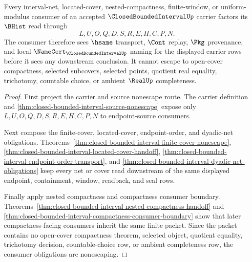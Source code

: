 \begin{theorem}
\label{thm:closed-bounded-interval-consumer-nonescape-obligations}
Every interval-net, located-cover, nested-compactness, finite-window, or uniform-modulus consumer of an accepted $\ClosedBoundedIntervalUp$ carrier factors its $\BHist$ read through
$$
L,U,O,Q,D,S,R,E,H,C,P,N .
$$
The consumer therefore sees $\hsame$ transport, $\Cont$ replay, $\Pkg$ provenance, and local $\NameCert_{\ClosedBoundedIntervalUp}$ naming for the displayed carrier rows before it sees any downstream conclusion. It cannot escape to open-cover compactness, selected subcovers, selected points, quotient real equality, trichotomy, countable choice, or ambient $\RealUp$ completeness.
\end{theorem}
\begin{proof}
First project the carrier and source nonescape route. The carrier definition and \autoref{thm:closed-bounded-interval-source-nonescape} expose only $L,U,O,Q,D,S,R,E,H,C,P,N$ to endpoint-source consumers.

Next compose the finite-cover, located-cover, endpoint-order, and dyadic-net obligations. Theorems~\ref{thm:closed-bounded-interval-finite-cover-nonescape}, \ref{thm:closed-bounded-interval-located-cover-handoff}, \ref{thm:closed-bounded-interval-endpoint-order-transport}, and \ref{thm:closed-bounded-interval-dyadic-net-obligations} keep every net or cover read downstream of the same displayed endpoint, containment, window, readback, and seal rows.

Finally apply nested compactness and compactness consumer boundary. Theorems~\ref{thm:closed-bounded-interval-nested-compactness-handoff} and \ref{thm:closed-bounded-interval-compactness-consumer-boundary} show that later compactness-facing consumers inherit the same finite packet. Since the packet contains no open-cover compactness theorem, selected object, quotient equality, trichotomy decision, countable-choice row, or ambient completeness row, the consumer obligations are nonescaping.
\end{proof}

